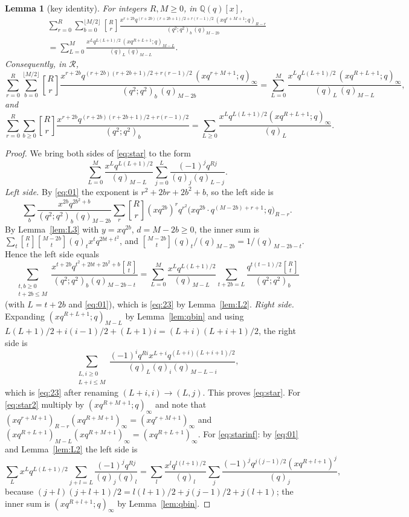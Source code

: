 \documentclass[11pt]{amsart}
\newtheorem{lemma}[theorem]{Lemma}
\theoremstyle{definition}
\numberwithin{equation}{section}
\newcommand{\Q}{\mathbb{Q}}
\newcommand{\R}{\mathcal{R}}
\newcommand{\qbin}[2]{\genfrac{[}{]}{0pt}{}{#1}{#2}}
\begin{document}
\begin{lemma}[key identity]\label{lem:key}
For integers $R,M\ge0$, in $\Q(q)[x]$,
\begin{multline}\label{eq:star}
\sum_{r=0}^{R}\sum_{b=0}^{\lfloor M/2\rfloor}\qbin Rr
\frac{x^{r+2b}q^{(r+2b)(r+2b+1)/2+r(r-1)/2}\,(xq^{r+M+1};q)_{R-r}}{(q^2;q^2)_b\,(q)_{M-2b}}\\
=\sum_{L=0}^{M}\frac{x^Lq^{L(L+1)/2}\,(xq^{R+L+1};q)_{M-L}}{(q)_L\,(q)_{M-L}} .
\end{multline}
Consequently, in $\R$,
\begin{equation}\label{eq:star2}
\sum_{r=0}^{R}\sum_{b=0}^{\lfloor M/2\rfloor}\qbin Rr
\frac{x^{r+2b}q^{(r+2b)(r+2b+1)/2+r(r-1)/2}\,(xq^{r+M+1};q)_\infty}{(q^2;q^2)_b\,(q)_{M-2b}}
=\sum_{L=0}^{M}\frac{x^Lq^{L(L+1)/2}\,(xq^{R+L+1};q)_\infty}{(q)_L\,(q)_{M-L}},
\end{equation}
and
\begin{equation}\label{eq:starinf}
\sum_{r=0}^{R}\sum_{b\ge0}\qbin Rr\frac{x^{r+2b}q^{(r+2b)(r+2b+1)/2+r(r-1)/2}}{(q^2;q^2)_b}
=\sum_{L\ge0}\frac{x^Lq^{L(L+1)/2}(xq^{R+L+1};q)_\infty}{(q)_L} .
\end{equation}
\end{lemma}
\begin{proof}
We bring both sides of \eqref{eq:star} to the form
\begin{equation}\label{eq:23}
\sum_{L=0}^{M}\frac{x^Lq^{L(L+1)/2}}{(q)_{M-L}}\sum_{j=0}^{L}\frac{(-1)^jq^{Rj}}{(q)_j(q)_{L-j}} .
\end{equation}
\emph{Left side.} By \eqref{eq:01} the exponent is $r^2+2br+2b^2+b$, so the left side is
\[
\sum_b\frac{x^{2b}q^{2b^2+b}}{(q^2;q^2)_b(q)_{M-2b}}\sum_r\qbin Rr(xq^{2b})^rq^{r^2}\bigl(xq^{2b}\cdot q^{(M-2b)+r+1};q\bigr)_{R-r}.
\]
By Lemma~\ref{lem:L3} with $y=xq^{2b}$, $d=M-2b\ge0$, the inner sum is
$\sum_t\qbin Rt\qbin{M-2b}t(q)_tx^tq^{2bt+t^2}$, and $\qbin{M-2b}t(q)_t/(q)_{M-2b}=1/(q)_{M-2b-t}$. Hence
the left side equals
\[
\sum_{\substack{t,b\ge0\\t+2b\le M}}\frac{x^{t+2b}q^{t^2+2bt+2b^2+b}\qbin Rt}{(q^2;q^2)_b(q)_{M-2b-t}}
=\sum_{L=0}^{M}\frac{x^Lq^{L(L+1)/2}}{(q)_{M-L}}\sum_{t+2b=L}\frac{q^{t(t-1)/2}\qbin Rt}{(q^2;q^2)_b}
\]
(with $L=t+2b$ and \eqref{eq:01}), which is \eqref{eq:23} by Lemma~\ref{lem:L2}.
\emph{Right side.} Expanding $(xq^{R+L+1};q)_{M-L}$ by Lemma~\ref{lem:qbin} and using
$L(L+1)/2+i(i-1)/2+(L+1)i=(L+i)(L+i+1)/2$, the right side is
\[
\sum_{\substack{L,i\ge0\\L+i\le M}}\frac{(-1)^iq^{Ri}x^{L+i}q^{(L+i)(L+i+1)/2}}{(q)_L(q)_i(q)_{M-L-i}},
\]
which is \eqref{eq:23} after renaming $(L+i,i)\to(L,j)$. This proves \eqref{eq:star}. For
\eqref{eq:star2} multiply by $(xq^{R+M+1};q)_\infty$ and note that
$(xq^{r+M+1})_{R-r}(xq^{R+M+1})_\infty=(xq^{r+M+1})_\infty$ and
$(xq^{R+L+1})_{M-L}(xq^{R+M+1})_\infty=(xq^{R+L+1})_\infty$. For \eqref{eq:starinf}: by \eqref{eq:01}
and Lemma~\ref{lem:L2} the left side is
\[
\sum_Lx^Lq^{L(L+1)/2}\sum_{j+l=L}\frac{(-1)^jq^{Rj}}{(q)_j(q)_l}
=\sum_l\frac{x^lq^{l(l+1)/2}}{(q)_l}\sum_j\frac{(-1)^jq^{j(j-1)/2}(xq^{R+l+1})^j}{(q)_j},
\]
because $(j+l)(j+l+1)/2=l(l+1)/2+j(j-1)/2+j(l+1)$; the inner sum is $(xq^{R+l+1};q)_\infty$ by
Lemma~\ref{lem:qbin}.
\end{proof}
\end{document}

